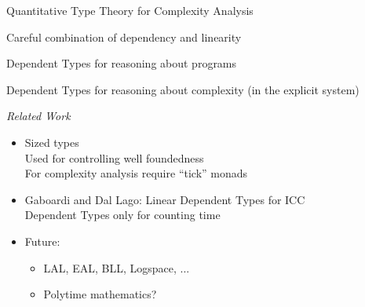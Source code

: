 \documentclass[xetex,serif,mathserif,aspectratio=169]{beamer}
\begin{document}
\begin{frame}


  \point Quantitative Type Theory for Complexity Analysis\\

  \bigskip

  \point Careful combination of dependency and linearity\\

  \bigskip

  \point Dependent Types for reasoning about programs \\

  \bigskip

  \point Dependent Types for reasoning about complexity (in the explicit system)

  \pause
  \bigskip

  {\it Related Work}
  \begin{itemize}
  \item Sized types \\
    \textcolor{black!60}{Used for controlling well foundedness} \\
    \textcolor{black!60}{For complexity analysis require ``tick'' monads} \\
  \item Gaboardi and Dal Lago: Linear Dependent Types for ICC \\
    \textcolor{black!60}{Dependent Types only for counting time}
  \item Future:
    \begin{itemize}
    \item LAL, EAL, BLL, Logspace, ...
    \item Polytime mathematics?
    \end{itemize}
  \end{itemize}
\end{frame}
\end{document}
